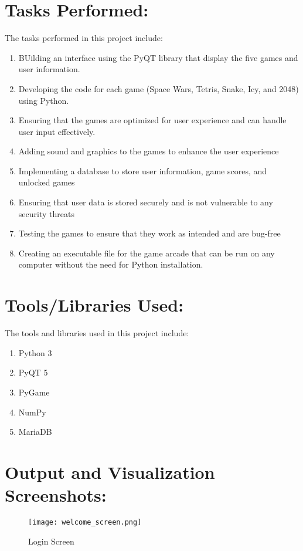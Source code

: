 \documentclass[16pt]{article}
\begin{document}
\section{Tasks Performed:}
The tasks performed in this project include:
\begin{enumerate}
    \item BUilding an interface using the PyQT library that display the five games and user information.
    \item Developing the code for each game (Space Wars, Tetris, Snake, Icy, and 2048) using Python.
    \item Ensuring that the games are optimized for user experience and can handle user input effectively.
    \item Adding sound and graphics to the games to enhance the user experience
    \item Implementing a database to store user information, game scores, and unlocked games
    \item Ensuring that user data is stored securely and is not vulnerable to any security threats
    \item Testing the games to ensure that they work as intended and are bug-free
    \item Creating an executable file for the game arcade that can be run on any computer without the need for Python installation.
\end{enumerate}

\section{Tools/Libraries Used:}
The tools and libraries used in this project include:
\begin{enumerate}
    \item Python 3
    \item PyQT 5
    \item PyGame
    \item NumPy
    \item MariaDB
\end{enumerate}

\section{Output and Visualization Screenshots:}
\begin{figure}[H]
    \centering
    \texttt{[image: welcome\_screen.png]}
    \caption{Login Screen}
\end{figure}
\end{document}
